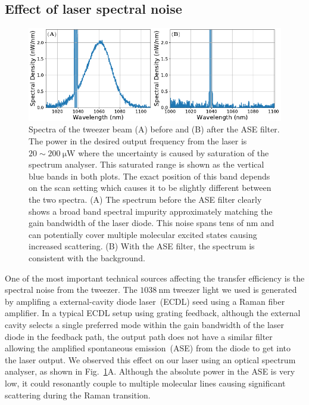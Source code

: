 \subsection{Effect of laser spectral noise}
\label{ch:raman-transfer:results:ase}

\begin{figure}
  \centering
  \includegraphics[width=\textwidth]{figures/raman_transfer_spectra.pdf}
  \caption[Tweezer spectra before and after ASE filter.]{
    Spectra of the tweezer beam (A) before and (B) after the ASE filter.
    The power in the desired output frequency from the laser is $20\sim200~\mathrm{\mu W}$
    where the uncertainty is caused by saturation of the spectrum analyser.
    This saturated range is shown as the vertical blue bands in both plots.
    The exact position of this band depends on the scan setting
    which causes it to be slightly different between the two spectra.
    (A) The spectrum before the ASE filter clearly shows a broad band spectral impurity
    approximately matching the gain bandwidth of the laser diode.
    This noise spans tens of nm and can potentially cover multiple molecular excited states
    causing increased scattering.
    (B) With the ASE filter, the spectrum is consistent with the background.
    \label{fig:raman-transfer:results:ase:spectra}}
\end{figure}

One of the most important technical sources affecting the transfer efficiency
is the spectral noise from the tweezer.
The $1038~\mathrm{nm}$ tweezer light we used is generated
by amplifing a external-cavity diode laser~(ECDL) seed using a Raman fiber amplifier.
In a typical ECDL setup using grating feedback,
although the external cavity selects a single preferred mode
within the gain bandwidth of the laser diode in the feedback path,
the output path does not have a similar filter
allowing the amplified spontaneous emission~(ASE)
from the diode to get into the laser output.
We observed this effect on our laser using an optical spectrum analyser,
as shown in Fig.~\ref{fig:raman-transfer:results:ase:spectra}A.
Although the absolute power in the ASE is very low,
it could resonantly couple to multiple molecular lines
causing significant scattering during the Raman transition.

